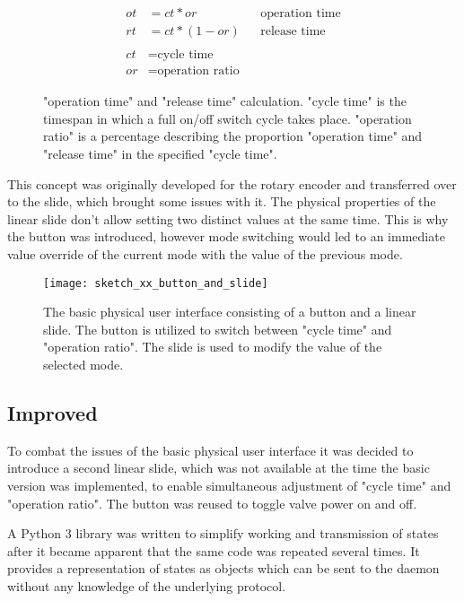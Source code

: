 \begin{figure}[h]
\begin{align*}
    ot &=ct * or && \text{operation time} \\
    rt &=ct * (1 - or) && \text{release time} \\ \\
    ct &= \text{cycle time} \\
    or &= \text{operation ratio}
\end{align*}
\caption{"operation time" and "release time" calculation. "cycle time" is the timespan in which a full on/off switch cycle takes place. "operation ratio" is a percentage describing the proportion "operation time" and "release time" in the specified "cycle time".}
\end{figure}

This concept was originally developed for the rotary encoder and transferred over to the slide, which brought some issues with it. The physical properties of the linear slide don't allow setting two distinct values at the same time. This is why the button was introduced, however mode switching would led to an immediate value override of the current mode with the value of the previous mode.

\begin{figure}[h]
\centering

\texttt{[image: sketch\_xx\_button\_and\_slide]}

\caption{The basic physical user interface consisting of a button and a linear slide. The button is utilized to switch between "cycle time" and "operation ratio". The slide is used to modify the value of the selected mode.}
\end{figure}

\subsection{Improved}
To combat the issues of the basic physical user interface it was decided to introduce a second linear slide, which was not available at the time the basic version was implemented, to enable simultaneous adjustment of "cycle time" and "operation ratio". The button was reused to toggle valve power on and off.

A Python 3 library was written to simplify working and transmission of states after it became apparent that the same code was repeated several times. It provides a representation of states as objects which can be sent to the daemon without any knowledge of the underlying protocol. 

